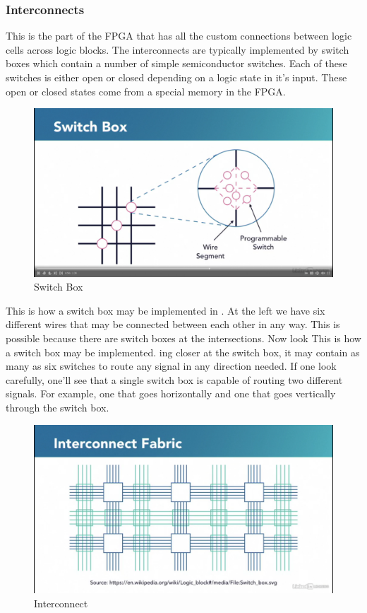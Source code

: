 \subsubsection{Interconnects}
This is the part of the FPGA that has all the custom connections between logic cells across logic blocks. The interconnects are typically implemented by switch boxes which contain a number of simple semiconductor switches. Each of these switches is either open or closed depending on a logic state in it's input. These open or closed states come from a special memory in the FPGA.

\begin{figure}[H]
	\begin{center}
		\includegraphics[width=5in]{images/ICSwitch.png}
		\caption{Switch Box}
		\label{SwitchBox}
	\end{center}
\end{figure}

This is how a switch box may be implemented in . At the left we have six different wires that may be connected between each other in any way. This is possible because there are switch boxes at the intersections. Now look This is how a switch box may be implemented. ing closer at the switch box, it may contain as many as six switches to route any signal in any direction needed. If one look carefully, one'll see that a single switch box is capable of routing two different signals. For example, one that goes horizontally and one that goes vertically through the switch box. 

\begin{figure}[H]
	\begin{center}
		\includegraphics[width=5in]{images/IC.png}
		\caption{Interconnect}
		\label{Interconnect}
	\end{center}
\end{figure}

